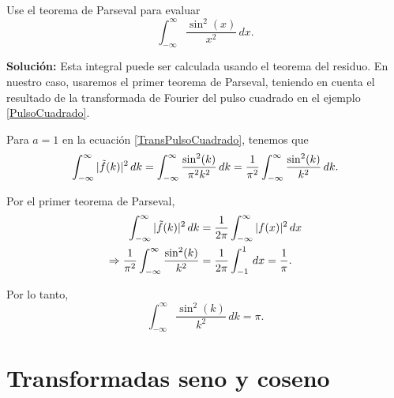 \begin{ejemplo}
    Use el teorema de Parseval para evaluar
    $$\int_{-\infty}^{\infty}  \frac{\sin^2(x)}{x^2} \,dx.$$

    \textbf{Solución:} Esta integral puede ser calculada usando el teorema del residuo. En nuestro caso, usaremos el primer teorema de Parseval, teniendo en cuenta el resultado de la transformada de Fourier del pulso cuadrado en el ejemplo \ref{PulsoCuadrado}. 

    Para $a = 1$ en la ecuación \eqref{TransPulsoCuadrado}, tenemos que
    $$\int_{- \infty}^{\infty} |\Tilde{f}(k)|^2 \,dk = \int_{- \infty}^{\infty} \frac{\sin^2(k)}{\pi^2 k^2}  \,dk = \frac{1}{\pi^2} \int_{-\infty}^{\infty}  \frac{\sin^2(k)}{k^2} \,dk.$$

    Por el primer teorema de Parseval,
    \begin{align*}
        \int_{- \infty}^{\infty} |\Tilde{f}(k)|^2 \,dk &= \frac{1}{2\pi} \int_{-\infty}^{\infty} |f(x)|^2 \,dx \\
        \Rightarrow \frac{1}{\pi^2} \int_{-\infty}^{\infty}  \frac{\sin^2(k)}{k^2} &= \frac{1}{2\pi} \int_{-1}^1 \,dx = \frac{1}{\pi}. 
    \end{align*}

Por lo tanto,
$$\int_{-\infty}^{\infty}  \frac{\sin^2(k)}{k^2} \,dk = \pi.$$
\end{ejemplo}

\section{Transformadas seno y coseno}

